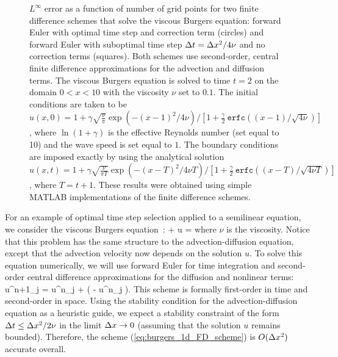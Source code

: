 \documentclass[oneeqnum,onefignum,onetabnum,onethmnum]{siamltex}
\begin{document}
\begin{figure}[!t]
\begin{center}
\caption{$L^\infty$ error as a function of number of grid points for
two finite difference schemes that solve the viscous Burgers equation:
forward Euler with optimal time step and correction term (circles)
and forward Euler with suboptimal time step $\Delta t = \Delta x^2/4\nu$ and no 
correction terms (squares).
Both schemes use second-order, central finite difference approximations for
the advection and diffusion terms.
The viscous Burgers equation is solved to time $t=2$ on the domain 
$0 < x < 10$ with the viscosity $\nu$ set to $0.1$.  The initial conditions are 
taken to be 
$u(x,0) = 1 + \gamma \sqrt{\frac{\nu}{\pi}} \exp\left( -(x-1)^2/4 \nu \right) 
            / \left[ 1 + \frac{\gamma}{2} \ 
                         \mathtt{erfc}\left((x-1)/\sqrt{4\nu} \right) 
    \right]$,
where $\ln(1+\gamma)$ is the effective Reynolds number (set equal to 10) and 
the wave speed is set equal to $1$.  The boundary conditions are imposed 
exactly by using
the analytical solution
$u(x,t) = 1 + \gamma \sqrt{\frac{\nu}{\pi T}} 
              \exp\left( -(x-T)^2/4 \nu T \right) 
            / \left[ 1 + \frac{\gamma}{2} \ 
                         \mathtt{erfc}\left((x-T)/\sqrt{4\nu T} \right) 
    \right]$,
where $T = t+1$.
These results were obtained using simple MATLAB implementations of the 
finite difference schemes.
}
\label{fig:burgers_1d_error}
\end{center}
\end{figure}

For an example of optimal time step selection applied to a semilinear equation,
we consider the viscous Burgers equation~\cite{whitham_book}:
\beq
  \frac{\partial u}{\pt} + u \frac{\partial u}{\px} = 
     \nu {} 
  \label{eq:burgers_1d}
\eeq
where $\nu$ is the viscosity.  Notice that this problem has the same structure
to the advection-diffusion equation, except that the advection velocity now 
depends on the solution $u$.  To solve this equation numerically,
we will use forward Euler for time integration and second-order central 
difference approximations for the diffusion and nonlinear terms:
\beq
  u^{n+1}_j = u^{n}_j 
  + \dt 
    \left( \nu 
      \left [ \frac{u^{n}_{j+1} -2 u^{n}_j + u^{n}_{j-1}}{\dx^2} \right]
         - u^n_j 
      \left[ \frac{u^{n}_{j+1} - u^{n}_{j-1}}{2 \dx} \right] 
    \right).
  \label{eq:burgers_1d_FD_scheme}
\eeq
This scheme is formally first-order in time and second-order in space.  
Using the stability condition for the advection-diffusion equation as a 
heuristic guide, we expect a stability constraint of the form 
$\Delta t \le \Delta x^2/2 \nu$ in the limit $\Delta x \rightarrow 0$ (assuming that 
the solution $u$ remains bounded).  Therefore, the scheme 
(\ref{eq:burgers_1d_FD_scheme}) is $O(\Delta x^2)$ accurate overall. 
\end{document}
